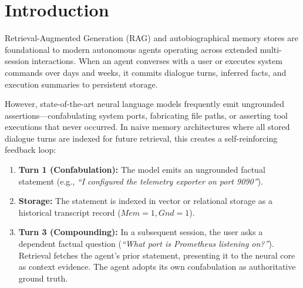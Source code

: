 \documentclass[11pt,a4paper]{article}
\begin{document}
\begin{abstract}
and 12B (secondary NLI grader: 6/40 due to lexical overlap on negated refusals) and 1/40 ($2.5\%$) on E4B and E2B (and 0/10 across all four scales in the post-WO-39 V2c live re-evaluation). Finally, on user-originated falsehoods (Cohort~C), uncorroborated provenance absorbs user testimony (30/30 in v1), whereas wiring live \texttt{is\_content\_corroborated()} verification (Study~V2b, WO-39) and \texttt{BelnapLatentInvestigator} ($\bot/\top$) fail-closed contradiction isolation (WO-43) reduces falsehood grounding to 0/10 on 26B-A4B, 12B, and E4B (3/10 on E2B) in V2b and \textbf{0/100 ($0.0\%$, $p = 4.16 \times 10^{-23}$) on the $N=300$ v3 benchmark}. Inter-grader agreement between the deterministic regex/CAS primary grader and the secondary OpenVINO MiniLM-L6 NLI cross-encoder yields Cohen's $\kappa = 0.7683$ in v1 ($\kappa = 0.7642$ in V2d) and \textbf{$\kappa = 0.9850$ across all $1{,}500$ pairs in v3} (dual blinded judge IRR $\kappa = 0.9206$ vs.\ automated grader, inter-judge $\kappa = 1.0000$ on $n=60$). On the companion $N=300$ ($900$-turn) Contrastive Battery v2 ($n=100$ per stratum), full compound Lucca achieves \textbf{99/100 ($99.0\%$)} cross-session recall ($+94.0\text{ pp}$ over Bare LLM, $p_{\text{HB}} = 7.76 \times 10^{-21}$; $+13.0\text{ pp}$ over top-5 Hybrid RAG, $p_{\text{HB}} = 0.00684$), \textbf{95/100 ($95.0\%$)} receipt introspection, and \textbf{90/100 ($90.0\%$)} ungrounded abstention.
\end{abstract}

\section{Introduction}
\label{sec:intro}
Retrieval-Augmented Generation (RAG) and autobiographical memory stores are foundational to modern autonomous agents operating across extended multi-session interactions. When an agent converses with a user or executes system commands over days and weeks, it commits dialogue turns, inferred facts, and execution summaries to persistent storage.

However, state-of-the-art neural language models frequently emit ungrounded assertions---confabulating system ports, fabricating file paths, or asserting tool executions that never occurred. In naive memory architectures where all stored dialogue turns are indexed for future retrieval, this creates a self-reinforcing feedback loop:
\begin{enumerate}
    \item \textbf{Turn 1 (Confabulation):} The model emits an ungrounded factual statement (e.g., \emph{``I configured the telemetry exporter on port 9090''}).
    \item \textbf{Storage:} The statement is indexed in vector or relational storage as a historical transcript record ($Mem=1, Gnd=1$).
    \item \textbf{Turn 3 (Compounding):} In a subsequent session, the user asks a dependent factual question (\emph{``What port is Prometheus listening on?''}). Retrieval fetches the agent's prior statement, presenting it to the neural core as context evidence. The agent adopts its own confabulation as authoritative ground truth.
\end{enumerate}
\end{document}
